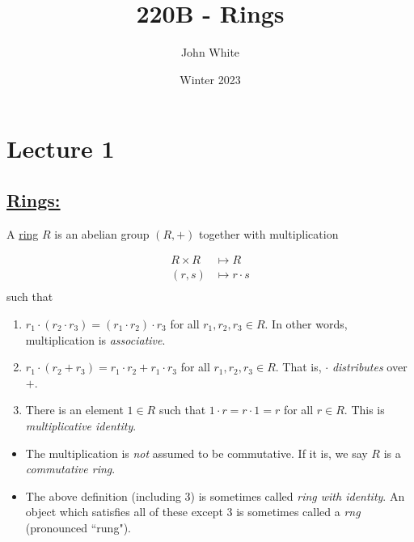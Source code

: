 \documentclass[x11names,reqno,14pt]{extarticle}
\title{220B - Rings}
\author{John White}
\date{Winter 2023}
\begin{document}
\section*{Lecture 1}

\subsection*{\underline{Rings:}}


A \underline{ring} $R$ is an abelian group $(R, +)$ together with multiplication

\begin{align*}
R\times R & \mapsto R \\
(r, s) & \mapsto r\cdot s \\ 
\end{align*}
such that
\begin{enumerate}
\item $r_1\cdot(r_2\cdot r_3) = (r_1\cdot r_2)\cdot r_3$ for all $r_1, r_2, r_3 \in R$. In other words, multiplication is \textit{associative}.
\item $r_1 \cdot(r_2 + r_3) = r_1\cdot r_2 + r_1\cdot r_3$ for all $r_1, r_2, r_3 \in R$. That is, $\cdot$ \textit{distributes} over $+$. 
\item There is an element $1 \in R$ such that $1\cdot r = r \cdot 1 = r$ for all $r \in R$. This is \textit{multiplicative identity}. 
\end{enumerate}

\rem
\begin{itemize}
\item The multiplication is \textit{not} assumed to be commutative. If it is, we say $R$ is a \textit{commutative ring}. 
\item The above definition (including 3) is sometimes called \textit{ring with identity}. An object which satisfies all of these except 3 is sometimes called a \textit{rng} (pronounced ``rung"). 
\end{itemize}

\exm
\end{document}
